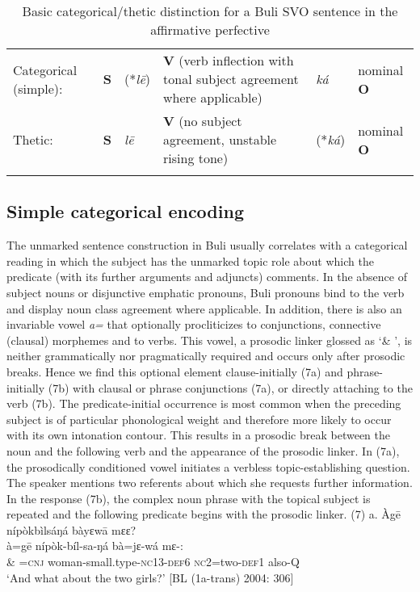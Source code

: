 \documentclass[output=paper]{langsci/langscibook}
\begin{document}
\begin{table}
\caption{Basic categorical/thetic distinction for a Buli SVO sentence in the affirmative perfective}
\label{tab:2}


\begin{tabularx}{\textwidth}{XXXXXX}
\lsptoprule

{Categorical (simple):} & {\textbf{S}} & {(*\textit{l\={e}})} & {\textbf{V} (verb inflection with tonal subject agreement where applicable)} & {\textit{ká}} & {nominal \textbf{O}}\\
{Thetic:} & {\textbf{S}} & {\textit{l\={e}}} & {\textbf{V} (no subject agreement, unstable rising tone)} & {(*\textit{ká})} & {nominal \textbf{O}}\\
\lspbottomrule
\end{tabularx}

\end{table} 

\subsection{Simple categorical encoding}

The unmarked sentence construction in Buli usually correlates with a categorical reading in which the subject has the unmarked topic role about which the predicate (with its further arguments and adjuncts) comments. In the absence of subject nouns or disjunctive emphatic pronouns, Buli pronouns bind to the verb and display noun class agreement where applicable. In addition, there is also an invariable vowel \textit{a=} that optionally procliticizes to conjunctions, connective (clausal) morphemes and to verbs. This vowel, a prosodic linker glossed as ‘\& ’, is neither grammatically nor pragmatically required and occurs only after prosodic breaks. Hence we find this optional element clause-initially (7a) and phrase-initially (7b) with clausal or phrase conjunctions (7a), or directly attaching to the verb (7b). The predicate-initial occurrence is most common when the preceding subject is of particular phonological weight and therefore more likely to occur with its own intonation contour. This results in a prosodic break between the noun and the following verb and the appearance of the prosodic linker. In (7a), the prosodically conditioned vowel initiates a verbless topic-establishing question. The speaker mentions two referents about which she requests further information. In the response (7b), the complex noun phrase with the topical subject is repeated and the following predicate begins with the prosodic linker.  
\ea
\glll \textup{(7)  a.}  Àg\={e}  nípòkbìlsáŋá        bàyɛw\={a}    mɛɛ?\\
     \textup{à=g\={e}  nípòk-bíl-sa-ŋá      bà=jɛ-wá    mɛ-:}\\
     \& =\textsc{cnj}  woman-small.type-\textsc{nc}13-\textsc{def}6  \textsc{nc}2=two-\textsc{def}1  also-\textsc{Q}\\
\glt   ‘And what about the two girls?’ [BL (1a-trans) 2004: 306]
\z
\end{document}
